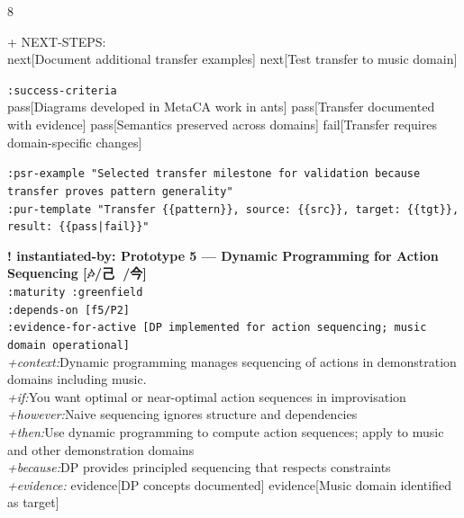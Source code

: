 \documentclass[landscape]{article}
\newcommand{\flexitag}[1]{\textcolor[gray]{0.35}{\textit{#1}}}
\newenvironment{devmapsettled}{%
  \def\FrameCommand{\colorbox{devmapsettledbg}}%
  \setlength{\fboxsep}{2pt}%
  \MakeFramed{\advance\hsize-\width \FrameRestore}%
}{\endMakeFramed}
\newenvironment{devmapgreenfield}{%
  \def\FrameCommand{\colorbox{devmapgreenfieldbg}}%
  \setlength{\fboxsep}{2pt}%
  \MakeFramed{\advance\hsize-\width \FrameRestore}%
}{\endMakeFramed}
\begin{document}
\begin{paracol}{8}
\begin{devmapsettled}
\par
  + NEXT-STEPS:\\
    next[Document additional transfer examples] next[Test transfer to music domain]\\
\par
  \texttt{:\allowbreak{}success-\allowbreak{}criteria}\\
    pass[Diagrams developed in MetaCA work in ants] pass[Transfer documented with evidence] pass[Semantics preserved across domains] fail[Transfer requires domain-specific changes]\\
\par
  \texttt{:\allowbreak{}psr-\allowbreak{}example "Selected transfer milestone for validation because transfer proves pattern generality"}\\
  \texttt{:\allowbreak{}pur-\allowbreak{}template "Transfer \{\{pattern\}\},\allowbreak{} source:\allowbreak{} \{\{src\}\},\allowbreak{} target:\allowbreak{} \{\{tgt\}\},\allowbreak{} result:\allowbreak{} \{\{pass|\allowbreak{}fail\}\}"}\\
\par
\par
\end{devmapsettled}
\begin{devmapgreenfield}
\textbf{! instantiated-by: Prototype 5 — Dynamic Programming for Action Sequencing [🎶/己 🌲/今]}\\
  \texttt{:\allowbreak{}maturity :\allowbreak{}greenfield}\\
  \texttt{:\allowbreak{}depends-\allowbreak{}on [f5/\allowbreak{}P2]}\\
  \texttt{:\allowbreak{}evidence-\allowbreak{}for-\allowbreak{}active [DP implemented for action sequencing;\allowbreak{} music domain operational]}\\
  \flexitag{+context:}Dynamic programming manages sequencing of actions in demonstration domains including music.\\
  \flexitag{+if:}You want optimal or near-optimal action sequences in improvisation\\
  \flexitag{+however:}Naive sequencing ignores structure and dependencies\\
  \flexitag{+then:}Use dynamic programming to compute action sequences; apply to music and other demonstration domains\\
  \flexitag{+because:}DP provides principled sequencing that respects constraints\\
  \flexitag{+evidence:} evidence[DP concepts documented] evidence[Music domain identified as target]\\

\end{devmapgreenfield}
\end{paracol}
\end{document}
